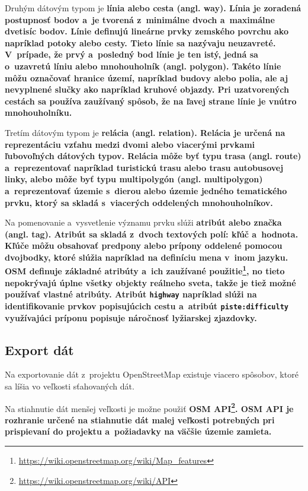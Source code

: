 Druhým dátovým typom je \bf línia \rm alebo cesta (angl. way). Línia je zoradená postupnosť bodov a~je tvorená z~minimálne dvoch a~maximálne dvetisíc bodov. Línie definujú lineárne prvky zemského povrchu ako napríklad potoky alebo cesty. Tieto línie sa nazývaju neuzavreté. V~prípade, že prvý a~posledný bod línie je ten istý, jedná sa o~uzavretú líniu alebo \bf mnohouholník \rm (angl. polygon). Takéto línie môžu označovať hranice území, napríklad budovy alebo polia, ale aj nevyplnené slučky ako napríklad kruhové objazdy. Pri uzatvorených cestách sa používa zaužívaný spôsob, že na ľavej strane línie je vnútro mnohouholníku.

Tretím dátovým typom je \bf relácia \rm (angl. relation). Relácia je určená na reprezentáciu vzťahu medzi dvomi alebo viacerými prvkami ľubovoľných dátových typov. Relácia môže byť typu \bf trasa \rm (angl. route) a~reprezentovať napríklad turistickú trasu alebo trasu autobusovej linky, alebo môže byť typu \bf multipolygón \rm (angl. multipolygon) a~reprezentovať územie s~dierou alebo územie jedného tematického prvku, ktorý sa skladá s~viacerých oddelených mnohouholníkov.

Na pomenovanie a~vysvetlenie významu prvku slúži \bf atribút \rm alebo značka (angl. tag). Atribút sa skladá z~dvoch textových polí: kľúč a~hodnota. Kľúče môžu obsahovať predpony alebo prípony oddelené pomocou dvojbodky, ktoré slúžia napríklad na definíciu mena v~inom jazyku. OSM definuje základné atribúty a~ich zaužívané použitie\footnote{\url{https://wiki.openstreetmap.org/wiki/Map_features}}, no tieto nepokrývajú úplne všetky objekty reálneho sveta, takže je tiež možné používať vlastné atribúty. Atribút {\tt highway} napríklad slúži na identifikovanie prvkov popisujúcich cestu a~atribút {\tt piste:difficulty} využívajúci príponu popisuje náročnosť lyžiarskej zjazdovky.

\subsection*{Export dát}
Na exportovanie dát z~projektu OpenStreetMap existuje viacero spôsobov, ktoré sa líšia vo veľkosti sťahovaných dát. 

Na stiahnutie dát menšej veľkosti je možne použiť \bf OSM API\rm\footnote{\url{https://wiki.openstreetmap.org/wiki/API}}. OSM API je rozhranie určené na stiahnutie dát malej veľkosti potrebných pri prispievaní do projektu a~požiadavky na väčšie územie zamieta.

